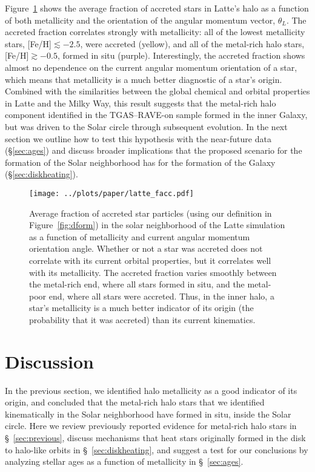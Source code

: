 \documentclass[apj, twocolappendix, numberedappendix, appendixfloats]{emulateapj}
\begin{document}
Figure~\ref{fig:facc} shows the average fraction of accreted stars in Latte's halo as a function of both metallicity and the orientation of the angular momentum vector, $\theta_L$.
The accreted fraction correlates strongly with metallicity: all of the lowest metallicity stars, [Fe/H]$\lesssim-2.5$, were accreted (yellow), and all of the metal-rich halo stars, [Fe/H]$\gtrsim-0.5$, formed in situ (purple).
Interestingly, the accreted fraction shows almost no dependence on the current angular momentum orientation of a star, which means that metallicity is a much better diagnostic of a star's origin.
Combined with the similarities between the global chemical and orbital properties in Latte and the Milky Way, this result suggests that the metal-rich halo component identified in the TGAS--RAVE-on sample formed in the inner Galaxy, but was driven to the Solar circle through subsequent evolution.
In the next section we outline how to test this hypothesis with the near-future data (\S\ref{sec:ages}) and discuss broader implications that the proposed scenario for the formation of the Solar neighborhood has for the formation of the Galaxy (\S\ref{sec:diskheating}).

\begin{figure}
\begin{center}
\texttt{[image: ../plots/paper/latte\_facc.pdf]}
\caption{Average fraction of accreted star particles (using our definition in Figure~\ref{fig:dform}) in the solar neighborhood of the Latte simulation as a function of metallicity and current angular momentum orientation angle.
Whether or not a star was accreted does not correlate with its current orbital properties, but it correlates well with its metallicity.
The accreted fraction varies smoothly between the metal-rich end, where all stars formed in situ, and the metal-poor end, where all stars were accreted.
Thus, in the inner halo, a star's metallicity is a much better indicator of its origin (the probability that it was accreted) than its current kinematics.
}
\label{fig:facc}
\end{center}
\end{figure}

\section{Discussion}

In the previous section, we identified halo metallicity as a good indicator of its origin, and concluded that the metal-rich halo stars that we identified kinematically in the Solar neighborhood have formed in situ, inside the Solar circle.
Here we review previously reported evidence for metal-rich halo stars in \S~\ref{sec:previous}, discuss mechanisms that heat stars originally formed in the disk to halo-like orbits in \S~\ref{sec:diskheating}, and suggest a test for our conclusions by analyzing stellar ages as a function of metallicity in \S~\ref{sec:ages}.
\end{document}
